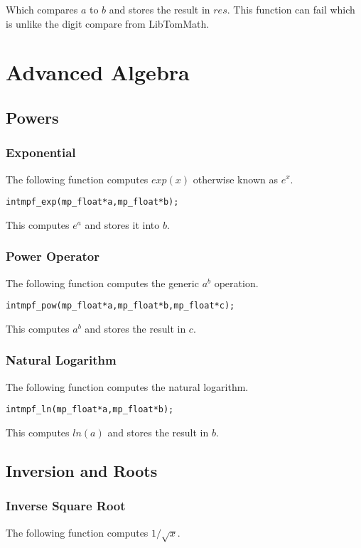 \documentclass[b5paper]{book}
\begin{document}
Which compares $a$ to $b$ and stores the result in $res$.  This function can fail which is unlike the digit compare from LibTomMath.

\chapter{Advanced Algebra}
\section{Powers}
\subsection{Exponential}
The following function computes $exp(x)$ otherwise known as $e^x$.

\begin{alltt}
int  mpf_exp(mp_float *a, mp_float *b);
\end{alltt}

This computes $e^a$ and stores it into $b$.  

\subsection{Power Operator}
The following function computes the generic $a^b$ operation.  

\begin{alltt}
int  mpf_pow(mp_float *a, mp_float *b, mp_float *c);
\end{alltt}
This computes $a^b$ and stores the result in $c$.

\subsection{Natural Logarithm}

The following function computes the natural logarithm.
\begin{alltt}
int  mpf_ln(mp_float *a, mp_float *b);
\end{alltt}
This computes $ln(a)$ and stores the result in $b$.

\section{Inversion and Roots}

\subsection{Inverse Square Root}
The following function computes $1 / \sqrt{x}$.
\end{document}
